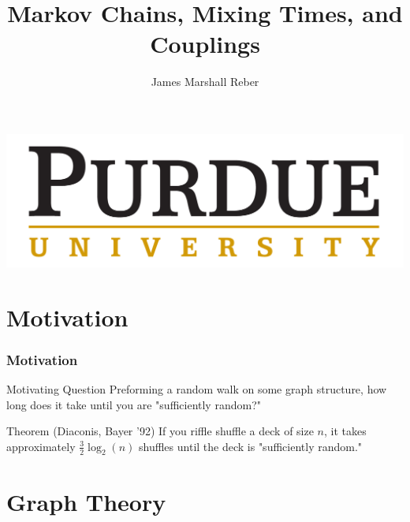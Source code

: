 \documentclass[svgnames,english]{beamer} %
\begin{document}
\title[Markov Chains and Mixing Times]{Markov Chains, Mixing Times, and Couplings}

\author{James Marshall Reber}

\begin{frame}
  \titlepage
  \begin{center}
    \includegraphics[scale=0.15]{purduelogo2.png}
\end{center}
\end{frame}

\section{Motivation}
\begin{frame}
\frametitle{Motivation}
\begin{block}{Motivating Question}
Preforming a random walk on some graph structure, how long does it take until you are "sufficiently random?"
\end{block} 

\begin{block}{Theorem (Diaconis, Bayer '92)}
If you riffle shuffle a deck of size $n$, it takes approximately $ \frac{3}{2} \log_2(n)$ shuffles until the deck is "sufficiently random."
\end{block}

\end{frame}

\section{Graph Theory}
\end{document}
